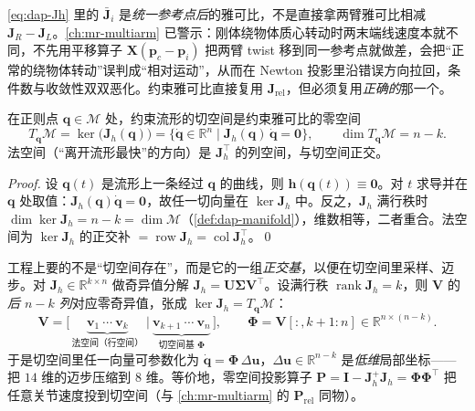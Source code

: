 \begin{pitfall}[相对雅可比的参考点陷阱]
\cref{eq:dap-Jh} 里的 $\bar{\mathbf{J}}_i$ 是\emph{统一参考点后}的雅可比，不是直接拿两臂雅可比相减 $\mathbf{J}_R-\mathbf{J}_L$。\cref{ch:mr-multiarm} 已警示：刚体绕物体质心转动时两末端线速度本就不同，不先用平移算子 $\mathbf{X}(\mathbf{p}_c-\mathbf{p}_i)$ 把两臂 twist 移到同一参考点就做差，会把“正常的绕物体转动”误判成“相对运动”，从而在 Newton 投影里沿错误方向拉回，条件数与收敛性双双恶化。约束雅可比直接复用 $\mathbf{J}_{\text{rel}}$，但必须复用\emph{正确的}那一个。
\end{pitfall}

\begin{theorem}[约束流形的切空间]\label{thm:dap-tangent}
在正则点 $\mathbf{q}\in\mathcal{M}$ 处，约束流形的切空间是约束雅可比的零空间
\begin{equation}
  T_{\mathbf{q}}\mathcal{M}=\ker\big(\mathbf{J}_h(\mathbf{q})\big)=\{\dot{\mathbf{q}}\in\mathbb{R}^n\mid \mathbf{J}_h(\mathbf{q})\,\dot{\mathbf{q}}=\mathbf{0}\},\qquad \dim T_{\mathbf{q}}\mathcal{M}=n-k.
  \label{eq:dap-tangent}
\end{equation}
法空间（“离开流形最快”的方向）是 $\mathbf{J}_h^\top$ 的列空间，与切空间正交。
\end{theorem}

\begin{proof}
设 $\mathbf{q}(t)$ 是流形上一条经过 $\mathbf{q}$ 的曲线，则 $\mathbf{h}(\mathbf{q}(t))\equiv\mathbf{0}$。对 $t$ 求导并在 $\mathbf{q}$ 处取值：$\mathbf{J}_h(\mathbf{q})\dot{\mathbf{q}}=\mathbf{0}$，故任一切向量在 $\ker\mathbf{J}_h$ 中。反之，$\mathbf{J}_h$ 满行秩时 $\dim\ker\mathbf{J}_h=n-k=\dim\mathcal{M}$（\cref{def:dap-manifold}），维数相等，二者重合。法空间为 $\ker\mathbf{J}_h$ 的正交补 $=\operatorname{row}\mathbf{J}_h=\operatorname{col}\mathbf{J}_h^\top$。\qed
\end{proof}

\begin{derivation}\label{der:dap-svd}
工程上要的不是“切空间存在”，而是它的一组\emph{正交基}，以便在切空间里采样、迈步。对 $\mathbf{J}_h\in\mathbb{R}^{k\times n}$ 做奇异值分解 $\mathbf{J}_h=\mathbf{U}\boldsymbol{\Sigma}\mathbf{V}^\top$。设满行秩 $\operatorname{rank}\mathbf{J}_h=k$，则 $\mathbf{V}$ 的\emph{后 $n-k$ 列}对应零奇异值，张成 $\ker\mathbf{J}_h=T_{\mathbf{q}}\mathcal{M}$：
\begin{equation}
  \mathbf{V}=\big[\,\underbrace{\mathbf{v}_1\ \cdots\ \mathbf{v}_k}_{\text{法空间（行空间）}}\ \big|\ \underbrace{\mathbf{v}_{k+1}\ \cdots\ \mathbf{v}_n}_{\text{切空间基 }\boldsymbol{\Phi}}\,\big],\qquad \boldsymbol{\Phi}=\mathbf{V}[:,k{+}1{:}n]\in\mathbb{R}^{n\times(n-k)}.
  \label{eq:dap-tanbasis}
\end{equation}
于是切空间里任一向量可参数化为 $\dot{\mathbf{q}}=\boldsymbol{\Phi}\,\Delta\mathbf{u}$，$\Delta\mathbf{u}\in\mathbb{R}^{n-k}$ 是\emph{低维}局部坐标——把 $14$ 维的迈步压缩到 $8$ 维。等价地，零空间投影算子 $\mathbf{P}=\mathbf{I}-\mathbf{J}_h^{+}\mathbf{J}_h=\boldsymbol{\Phi}\boldsymbol{\Phi}^\top$ 把任意关节速度投到切空间（与 \cref{ch:mr-multiarm} 的 $\mathbf{P}_{\text{rel}}$ 同物）。
\end{derivation}

